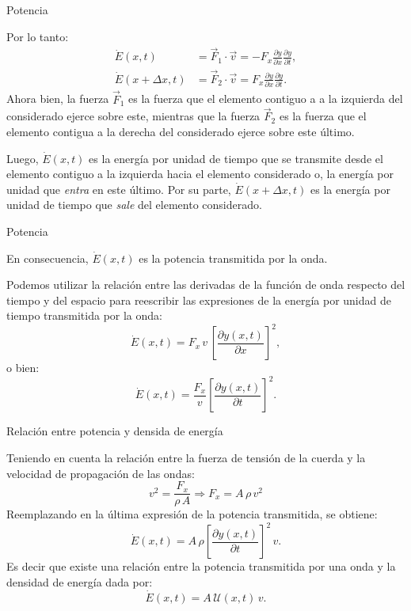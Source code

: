 \documentclass[11pt,handout,aspectratio=1610]{beamer}
\newcommand{\pdiff}[2]{\frac{\partial #1}{\partial #2}}
\newcommand{\vs}{\vspace{11pt}}
\begin{document}
\begin{frame}{Potencia}

    Por lo tanto:
    \begin{align*}
        \dot{E}\left(x,t\right) &= \vec{F}_1 \cdot \vec{v} = - F_{x} \pdiff{y}{x} \pdiff{y}{t},\\
        \dot{E} \left(x+\Delta x,t\right) &= \vec{F}_2 \cdot \vec{v} = F_{x} \pdiff{y}{x} \pdiff{y}{t}.
    \end{align*} Ahora bien, la fuerza $\vec{F}_1$ es la fuerza que el elemento contiguo a a la izquierda del considerado ejerce sobre este, mientras que la fuerza $\vec{F}_2$ es la fuerza que el elemento contigua a la derecha del considerado ejerce sobre este último. 
    
    \vs
    
    Luego, $\dot{E} \left(x,t\right)$ es la energía por unidad de tiempo que se transmite desde el elemento contiguo a la izquierda hacia el elemento considerado o, la energía por unidad que \emph{entra} en este último. Por su parte, $\dot{E} \left(x + \Delta x,t\right)$ es la energía por unidad de tiempo que \emph{sale} del elemento considerado.
    
\end{frame}

\begin{frame}{Potencia}

    En consecuencia, $\dot{E} \left(x,t\right)$ es la potencia transmitida por la onda.

    \vs

    Podemos utilizar la relación entre las derivadas de la función de onda respecto del tiempo y del espacio para reescribir las expresiones de la energía por unidad de tiempo transmitida por la onda: $$ \dot{E} \left(x,t\right) = F_x \, v \, \left[\pdiff{y\left(x,t\right)}{x}\right]^2, $$ o bien: $$ \dot{E} \left(x,t\right) = \frac{F_x}{v} \left[\pdiff{y\left(x,t\right)}{t}\right]^2.$$
\end{frame}

\begin{frame}{Relación entre potencia y densida de energía}

    Teniendo en cuenta la relación entre la fuerza de tensión de la cuerda y la velocidad de propagación de las ondas: $$ v^2 = \frac{F_x}{\rho \, A} \Rightarrow F_x = A \, \rho \, v^2 $$ Reemplazando en la última expresión de la potencia transmitida, se obtiene: $$ \dot{E} \left(x,t\right) = A \, \rho \left[\pdiff{y\left(x,t\right)}{t}\right]^2 \, v. $$ Es decir que existe una relación entre la potencia transmitida por una onda y la densidad de energía dada por: $$ \dot{E} \left(x,t\right) = A \, \mathcal{U} \left(x,t\right) \, v. $$
    
\end{frame}
\end{document}
